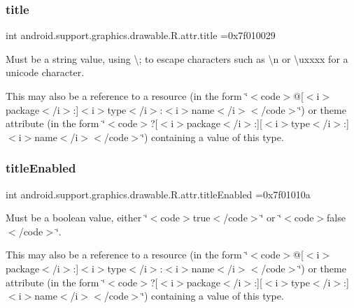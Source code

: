 \subsubsection{\texorpdfstring{title}{title}}
{\footnotesize\ttfamily int android.\+support.\+graphics.\+drawable.\+R.\+attr.\+title =0x7f010029\hspace{0.3cm}{\ttfamily [static]}}

Must be a string value, using \textquotesingle{}\textbackslash{};\textquotesingle{} to escape characters such as \textquotesingle{}\textbackslash{}n\textquotesingle{} or \textquotesingle{}\textbackslash{}uxxxx\textquotesingle{} for a unicode character. 

This may also be a reference to a resource (in the form \char`\"{}$<$code$>$@\mbox{[}$<$i$>$package$<$/i$>$\+:\mbox{]}$<$i$>$type$<$/i$>$\+:$<$i$>$name$<$/i$>$$<$/code$>$\char`\"{}) or theme attribute (in the form \char`\"{}$<$code$>$?\mbox{[}$<$i$>$package$<$/i$>$\+:\mbox{]}\mbox{[}$<$i$>$type$<$/i$>$\+:\mbox{]}$<$i$>$name$<$/i$>$$<$/code$>$\char`\"{}) containing a value of this type. \mbox{\label{classandroid_1_1support_1_1graphics_1_1drawable_1_1R_1_1attr_a94bc9bbbe96dca429fbdf8c43f0293a7}} 
\subsubsection{\texorpdfstring{title\+Enabled}{titleEnabled}}
{\footnotesize\ttfamily int android.\+support.\+graphics.\+drawable.\+R.\+attr.\+title\+Enabled =0x7f01010a\hspace{0.3cm}{\ttfamily [static]}}

Must be a boolean value, either \char`\"{}$<$code$>$true$<$/code$>$\char`\"{} or \char`\"{}$<$code$>$false$<$/code$>$\char`\"{}. 

This may also be a reference to a resource (in the form \char`\"{}$<$code$>$@\mbox{[}$<$i$>$package$<$/i$>$\+:\mbox{]}$<$i$>$type$<$/i$>$\+:$<$i$>$name$<$/i$>$$<$/code$>$\char`\"{}) or theme attribute (in the form \char`\"{}$<$code$>$?\mbox{[}$<$i$>$package$<$/i$>$\+:\mbox{]}\mbox{[}$<$i$>$type$<$/i$>$\+:\mbox{]}$<$i$>$name$<$/i$>$$<$/code$>$\char`\"{}) containing a value of this type. \mbox{\label{classandroid_1_1support_1_1graphics_1_1drawable_1_1R_1_1attr_a8e0ada7ba852dee56bea33539e994ab1}} 
